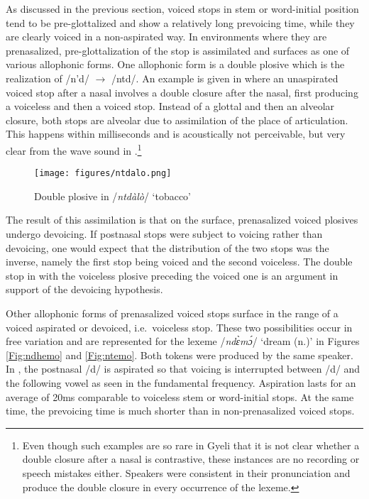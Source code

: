 As discussed in the previous section, voiced stops in stem or word-initial position tend to be pre-glottalized and show a relatively long prevoicing time, while they are clearly voiced in a non-aspirated way. In environments where they are prenasalized, pre-glottalization of the stop is assimilated and surfaces as one of various allophonic forms. One allophonic form is a double plosive which is the realization of /n'd/ $\rightarrow$ /ntd/. An example is given in  where an unaspirated voiced stop after a nasal involves a double closure after the nasal, first producing a voiceless and then a voiced stop. Instead of a glottal and then an alveolar closure, both stops are alveolar due to assimilation of the place of articulation. This happens within milliseconds and is acoustically not perceivable, but very clear from the wave sound in .\footnote{Even though such examples are so rare in Gyeli that it is not clear whether a double closure after a nasal is contrastive, these instances are no recording or speech mistakes either. Speakers were consistent in their pronunciation and produce the double closure in every occurrence of the lexeme.}

\begin{figure}
\texttt{[image: figures/ntdalo.png]}
\caption{Double plosive in /{\itshape ntdàlò}/ `tobacco'}
\label{Fig:ntdalo}
\end{figure}

The result of this assimilation is that on the surface, prenasalized voiced plosives undergo devoicing. If postnasal stops were subject to voicing rather than devoicing, one would expect that the distribution of the two stops was the inverse, namely the first stop being voiced and the second voiceless. The double stop in  with the voiceless plosive preceding the voiced one is an argument in support of the devoicing hypothesis.

Other allophonic forms of prenasalized voiced stops surface in the range of a voiced aspirated or devoiced, i.e.\ voiceless stop. These two possibilities occur in free variation and are represented for the lexeme /{\itshape ndɛ̀mɔ́}/ `dream (n.)' in Figures \ref{Fig:ndhemo} and \ref{Fig:ntemo}. Both tokens were produced by the same speaker. In , the postnasal /d/ is aspirated so that voicing is interrupted between /d/ and the following vowel as seen in the fundamental frequency.
Aspiration lasts for an average of 20ms comparable to voiceless stem or word-initial stops. 
At the same time, the prevoicing time is much shorter than in non-prenasalized voiced stops.

